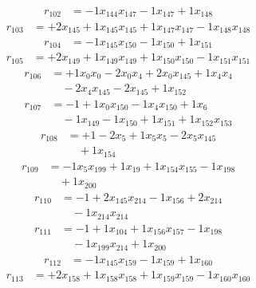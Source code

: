 \[\begin{aligned}
r_{102} &= - 1 x_{144} x_{147} - 1 x_{147} + 1 x_{148}
\end{aligned}\]
\[\begin{aligned}
r_{103} &= + 2 x_{145} + 1 x_{145} x_{145} + 1 x_{147} x_{147} - 1 x_{148} x_{148}
\end{aligned}\]
\[\begin{aligned}
r_{104} &= - 1 x_{145} x_{150} - 1 x_{150} + 1 x_{151}
\end{aligned}\]
\[\begin{aligned}
r_{105} &= + 2 x_{149} + 1 x_{149} x_{149} + 1 x_{150} x_{150} - 1 x_{151} x_{151}
\end{aligned}\]
\[\begin{aligned}
r_{106} &= + 1 x_{0} x_{0} - 2 x_{0} x_{4} + 2 x_{0} x_{145} + 1 x_{4} x_{4} \\
 &\quad - 2 x_{4} x_{145} - 2 x_{145} + 1 x_{152}
\end{aligned}\]
\[\begin{aligned}
r_{107} &= - 1 + 1 x_{0} x_{150} - 1 x_{4} x_{150} + 1 x_{6} \\
 &\quad - 1 x_{149} - 1 x_{150} + 1 x_{151} + 1 x_{152} x_{153}
\end{aligned}\]
\[\begin{aligned}
r_{108} &= + 1 - 2 x_{5} + 1 x_{5} x_{5} - 2 x_{5} x_{145} \\
 &\quad + 1 x_{154}
\end{aligned}\]
\[\begin{aligned}
r_{109} &= - 1 x_{5} x_{199} + 1 x_{19} + 1 x_{154} x_{155} - 1 x_{198} \\
 &\quad + 1 x_{200}
\end{aligned}\]
\[\begin{aligned}
r_{110} &= - 1 + 2 x_{145} x_{214} - 1 x_{156} + 2 x_{214} \\
 &\quad - 1 x_{214} x_{214}
\end{aligned}\]
\[\begin{aligned}
r_{111} &= - 1 + 1 x_{104} + 1 x_{156} x_{157} - 1 x_{198} \\
 &\quad - 1 x_{199} x_{214} + 1 x_{200}
\end{aligned}\]
\[\begin{aligned}
r_{112} &= - 1 x_{145} x_{159} - 1 x_{159} + 1 x_{160}
\end{aligned}\]
\[\begin{aligned}
r_{113} &= + 2 x_{158} + 1 x_{158} x_{158} + 1 x_{159} x_{159} - 1 x_{160} x_{160}
\end{aligned}\]
